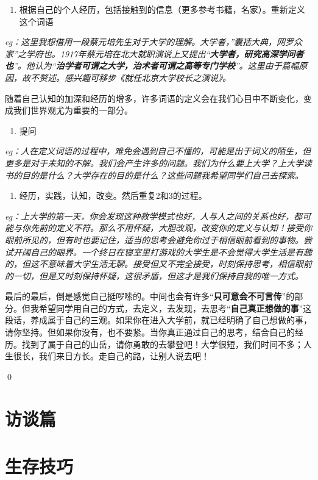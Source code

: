 \documentclass{beamer}	%
\theoremstyle{plain}
\theoremstyle{definition}
\theoremstyle{remark}
\numberwithin{equation}{section}
\begin{document}
\begin{frame}
	\begin{enumerate}[2]
		\item 根据自己的个人经历，包括接触到的信息（更多参考书籍，名家）。重新定义这个词语
	\end{enumerate}
	\vspace{1cm}

	\textit{eg：这里我想借用一段蔡元培先生对于大学的理解。大学者，”囊括大典，网罗众家”之学府也。1917年蔡元培在北大就职演说上又提出“\textbf{大学者，研究高深学问者也}”。他认为“\textbf{治学者可谓之大学，治术者可谓之高等专门学校}”。这里由于篇幅原因，故不赘述。感兴趣可移步《就任北京大学校长之演说》。}
	\vspace{0.5cm}

	随着自己认知的加深和经历的增多，许多词语的定义会在我们心目中不断变化，变成我们世界观尤为重要的一部分。
\end{frame}


\begin{frame}
	\begin{enumerate}[3]
		\item 提问
	\end{enumerate}
	\vspace{1cm}

	\textit{eg：人在定义词语的过程中，难免会遇到自己不懂的，可能是出于词义的陌生，但更多是对于未知的不解。我们会产生许多的问题。我们为什么要上大学？上大学读书的目的是什么？大学存在的目的是什么？这些问题我希望同学们自己去探索。}

\end{frame}

\begin{frame}
	\begin{enumerate}[4]
		\item 经历，实践，认知，改变。然后重复2和3的过程。
	\end{enumerate}
	\vspace{1cm}

	\textit{eg：上大学的第一天，你会发现这种教学模式也好，人与人之间的关系也好，都可能与你先前的定义不符。那么不用怀疑，大胆改观，改变你的定义与认知！接受你眼前所见的，但有时也要记住，适当的思考会避免你过于相信眼前看到的事物。尝试开阔自己的眼界。一个终日在寝室里打游戏的大学生是不会觉得大学生活是有趣的，但这不意味着大学生活无聊。接受但又不完全接受，时刻保持思考，相信眼前的一切，但是又时刻保持怀疑，这很矛盾，但这才是我们保持自我的唯一方式。}
\end{frame}


\begin{frame}
	最后的最后，倒是感觉自己挺啰嗦的。中间也会有许多“\textbf{只可意会不可言传}”的部分。但我希望同学用自己的方式，去定义，去发现，去思考“\textbf{自己真正想做的事}”这段话，养成属于自己的三观。如果你在进入大学前，就已经明确了自己想做的事，请你坚持。但如果你没有，也不要紧。当你真正通过自己的思考，结合自己的经历。找到了属于自己的山岳，请你勇敢的去攀登吧！大学很短，我们时间不多；人生很长，我们来日方长。走自己的路，让别人说去吧！

	\qed	
\end{frame}

\section{访谈篇}




\section{生存技巧}
\end{document}
